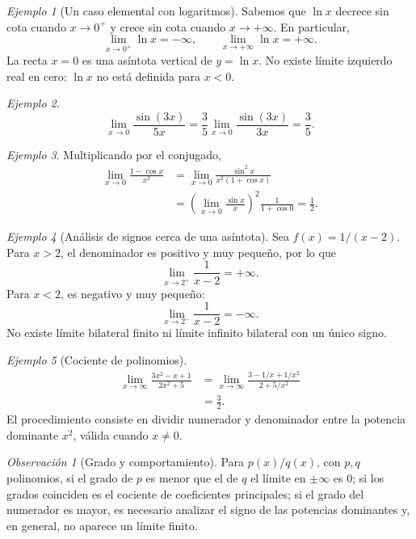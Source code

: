 \documentclass[12pt]{article}
\theoremstyle{remark}
\newtheorem{observacion}{Observación}
\newtheorem{ejemplo}{Ejemplo}
\begin{document}
\begin{ejemplo}[Un caso elemental con logaritmos]
Sabemos que $\ln x$ decrece sin cota cuando $x\to0^+$ y crece sin cota cuando $x\to+\infty$. En particular,
\[
\lim_{x\to0^+}\ln x=-\infty,\qquad
\lim_{x\to+\infty}\ln x=+\infty.
\]
La recta $x=0$ es una asíntota vertical de $y=\ln x$. No existe límite izquierdo real en cero: $\ln x$ no está definida para $x<0$.
\end{ejemplo}

\begin{ejemplo}
\[
\lim_{x\to0}\frac{\sin(3x)}{5x}
=\frac35\lim_{x\to0}\frac{\sin(3x)}{3x}=\boxed{\frac35}.
\]
\end{ejemplo}

\begin{ejemplo}
Multiplicando por el conjugado,
\begin{align*}
\lim_{x\to0}\frac{1-\cos x}{x^2}
&=\lim_{x\to0}\frac{\sin^2x}{x^2(1+\cos x)}\\
&=\left(\lim_{x\to0}\frac{\sin x}{x}\right)^2\frac1{1+\cos0}
=\boxed{\frac12}.
\end{align*}
\end{ejemplo}


\begin{ejemplo}[Análisis de signos cerca de una asíntota]
Sea $f(x)=1/(x-2)$. Para $x>2$, el denominador es positivo y muy pequeño, por lo que
\[\lim_{x\to2^+}\frac1{x-2}=+\infty.\]
Para $x<2$, es negativo y muy pequeño:
\[\lim_{x\to2^-}\frac1{x-2}=-\infty.\]
No existe límite bilateral finito ni límite infinito bilateral con un único signo.
\end{ejemplo}

\begin{ejemplo}[Cociente de polinomios]
\begin{align*}
\lim_{x\to\infty}\frac{3x^2-x+1}{2x^2+5}
&=\lim_{x\to\infty}\frac{3-1/x+1/x^2}{2+5/x^2}\\
&=\boxed{\frac32}.
\end{align*}
El procedimiento consiste en dividir numerador y denominador entre la potencia dominante $x^2$, válida cuando $x\ne0$.
\end{ejemplo}

\begin{observacion}[Grado y comportamiento]
Para $p(x)/q(x)$, con $p,q$ polinomios, si el grado de $p$ es menor que el de $q$ el límite en $\pm\infty$ es $0$; si los grados coinciden es el cociente de coeficientes principales; si el grado del numerador es mayor, es necesario analizar el signo de las potencias dominantes y, en general, no aparece un límite finito.
\end{observacion}
\end{document}
